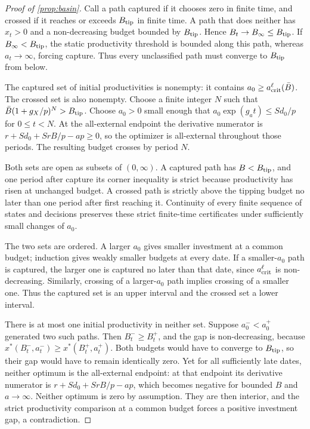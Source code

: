 \documentclass[11pt,a4paper]{article}
\theoremstyle{definition}\newtheorem{definition}{Definition}
\begin{document}
\begin{proof}[Proof of \cref{prop:basin}]
Call a path captured if it chooses zero in finite time, and crossed if
it reaches or exceeds $B_{\rm tip}$ in finite time. A path that does
neither has $x_t>0$ and a non-decreasing budget bounded by
$B_{\rm tip}$. Hence $B_t\to B_\infty\leq B_{\rm tip}$.
If $B_\infty<B_{\rm tip}$, the static productivity threshold is
bounded along this path, whereas $a_t\to\infty$, forcing capture.
Thus every unclassified path must converge to $B_{\rm tip}$ from below.

The captured set of initial productivities is nonempty: it contains
$a_0\geq a_{\rm crit}^{\ell}(\bar B)$. The crossed set is also
nonempty. Choose a finite integer $N$ such that
$\bar B(1+g_X/p)^N>B_{\rm tip}$. Choose $a_0>0$ small enough that
$a_0\exp(g_at)\leq Sd_0/p$ for $0\leq t<N$. At the all-external
endpoint the derivative numerator is
$r+Sd_0+SrB/p-ap\geq0$, so the optimizer is all-external throughout
those periods. The resulting budget crosses by period $N$.

Both sets are open as subsets of $(0,\infty)$. A captured path has
$B<B_{\rm tip}$, and one period after capture its corner inequality
is strict because productivity has risen at unchanged budget. A
crossed path is strictly above the tipping budget no later than one
period after first reaching it. Continuity of every finite sequence of
states and decisions preserves these strict finite-time certificates
under sufficiently small changes of $a_0$.

The two sets are ordered. A larger $a_0$ gives smaller investment at a
common budget; induction gives weakly smaller budgets at every date.
If a smaller-$a_0$ path is captured, the larger one is captured no later
than that date, since $a_{\rm crit}^{\ell}$ is non-decreasing.
Similarly, crossing of a larger-$a_0$ path implies crossing of a smaller
one. Thus the captured set is an upper interval and the crossed set a
lower interval.

There is at most one initial productivity in neither set. Suppose
$a_0^-<a_0^+$ generated two such paths. Then $B_t^-\geq B_t^+$,
and the gap is non-decreasing, because
$x^*(B_t^-,a_t^-)\geq x^*(B_t^+,a_t^+)$. Both budgets would have to
converge to $B_{\rm tip}$, so their gap would have to remain identically
zero. Yet for all sufficiently late dates, neither optimum is the
all-external endpoint: at that endpoint its derivative numerator is
$r+Sd_0+SrB/p-ap$, which becomes negative for bounded $B$ and
$a\to\infty$. Neither optimum is zero by assumption. They are then
interior, and the strict productivity comparison at a common budget
forces a positive investment gap, a contradiction.


\end{proof}
\end{document}

